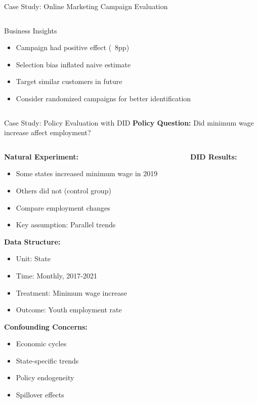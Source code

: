 \documentclass[aspectratio=169,11pt]{beamer}
\begin{document}
\begin{frame}[fragile]{Case Study: Online Marketing Campaign Evaluation}
\begin{columns}
\begin{column}{0.45\textwidth}
\vspace{0.3cm}
\begin{block}{Business Insights}
\begin{itemize}
\item Campaign had positive effect (~8pp)
\item Selection bias inflated naive estimate
\item Target similar customers in future
\item Consider randomized campaigns for better identification
\end{itemize}
\end{block}
\end{column}
\end{columns}
\end{frame}

\begin{frame}{Case Study: Policy Evaluation with DID}
\textbf{Policy Question:} Did minimum wage increase affect employment?

\begin{columns}
\begin{column}{0.5\textwidth}
\textbf{Natural Experiment:}
\begin{itemize}
\item Some states increased minimum wage in 2019
\item Others did not (control group)
\item Compare employment changes
\item Key assumption: Parallel trends
\end{itemize}

\vspace{0.3cm}
\textbf{Data Structure:}
\begin{itemize}
\item Unit: State
\item Time: Monthly, 2017-2021
\item Treatment: Minimum wage increase
\item Outcome: Youth employment rate
\end{itemize}

\vspace{0.3cm}
\textbf{Confounding Concerns:}
\begin{itemize}
\item Economic cycles
\item State-specific trends
\item Policy endogeneity
\item Spillover effects
\end{itemize}
\end{column}
\begin{column}{0.5\textwidth}
\textbf{DID Results:}


\end{column}
\end{columns}
\end{frame}
\end{document}
